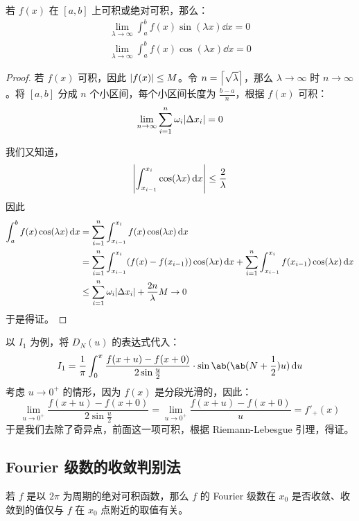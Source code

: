 \begin{lemma}
    若 $f(x)$ 在 $[a, b]$ 上可积或绝对可积，那么：
    $$
    \begin{gathered}
        \lim_{\lambda \to \infty} \int_a^b f(x) \sin(\lambda x) \dd{x} = 0 \\
        \lim_{\lambda \to \infty} \int_a^b f(x) \cos(\lambda x) \dd{x} = 0
    \end{gathered}
    $$

    \begin{proof}
        若 $f(x)$ 可积，因此 $\abs{f(x)} \le M$。令 $n = \left\lceil \sqrt{\lambda} \right\rceil$，那么 $\lambda \to \infty$ 时 $n \to \infty$。将 $[a, b]$ 分成 $n$ 个小区间，每个小区间长度为 $\frac{b - a}{n}$，根据 $f(x)$ 可积：
        $$
        \lim_{n \to \infty} \sum_{i = 1}^{n} \omega_i \abs{\Delta x_i} = 0
        $$

        我们又知道，
        $$
        \abs{\int_{x_{i - 1}}^{x_i} \cos(\lambda x) \dd{x}} \le \frac{2}{\lambda}
        $$
        因此
        $$
        \begin{aligned}
            \int_a^b f(x) \cos(\lambda x) \dd{x} & = \sum_{i = 1}^{n} \int_{x_{i - 1}}^{x_i} f(x) \cos(\lambda x) \dd{x} \\
            & = \sum_{i = 1}^{n} \int_{x_{i - 1}}^{x_i} (f(x) - f(x_{i - 1})) \cos (\lambda x) \dd{x} + \sum_{i = 1}^{n} \int_{x_{i - 1}}^{x_i} f(x_{i - 1}) \cos (\lambda x) \dd{x} \\
            & \le \sum_{i = 1}^{n} \omega_i \abs{\Delta x_i} + \frac{2n}{\lambda} M \to 0
        \end{aligned}
        $$
        于是得证。
    \end{proof}
\end{lemma}

以 $I_1$ 为例，将 $D_N(u)$ 的表达式代入：
$$
I_1 = \frac{1}{\pi} \int_{0}^{\pi} \frac{f(x + u) - f(x + 0)}{2 \sin \frac{u}{2}} \cdot \sin \ab(\ab(N + \frac{1}{2}) u) \dd{u}
$$
考虑 $u \to 0^+$ 的情形，因为 $f(x)$ 是分段光滑的，因此：
$$
\lim_{u \to 0^+} \frac{f(x + u) - f(x + 0)}{2 \sin \frac{u}{2}} = \lim_{u \to 0^+} \frac{f(x + u) - f(x + 0)}{u} = f'_+(x)
$$
于是我们去除了奇异点，前面这一项可积，根据 Riemann-Lebesgue 引理，得证。

\subsection{Fourier 级数的收敛判别法}

\begin{theorem}
    若 $f$ 是以 $2\pi$ 为周期的绝对可积函数，那么 $f$ 的 Fourier 级数在 $x_0$ 是否收敛、收敛到的值仅与 $f$ 在 $x_0$ 点附近的取值有关。
\end{theorem}

